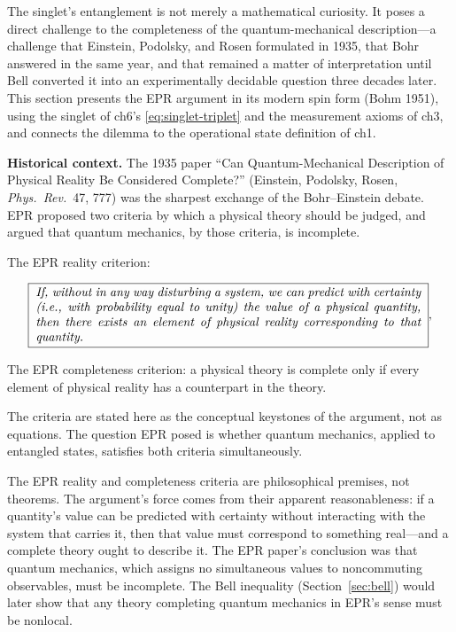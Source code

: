 The singlet's entanglement is not merely a mathematical curiosity. It poses a direct challenge to the completeness of the quantum-mechanical description---a challenge that Einstein, Podolsky, and Rosen formulated in 1935, that Bohr answered in the same year, and that remained a matter of interpretation until Bell converted it into an experimentally decidable question three decades later. This section presents the EPR argument in its modern spin form (Bohm 1951), using the singlet of ch6's \eqref{eq:singlet-triplet} and the measurement axioms of ch3, and connects the dilemma to the operational state definition of ch1.

\medskip\noindent\textbf{Historical context.}
The 1935 paper ``Can Quantum-Mechanical Description of Physical Reality Be Considered Complete?'' (Einstein, Podolsky, Rosen, \textit{Phys.\ Rev.}\ 47, 777) was the sharpest exchange of the Bohr--Einstein debate. EPR proposed two criteria by which a physical theory should be judged, and argued that quantum mechanics, by those criteria, is incomplete.

The EPR reality criterion:
\begin{linenomath}
\begin{equation}
\boxed{\;
\begin{minipage}{0.9\textwidth}
\itshape
If, without in any way disturbing a system, we can predict with certainty (i.e., with probability equal to unity) the value of a physical quantity, then there exists an element of physical reality corresponding to that quantity.
\end{minipage}
\;},
\label{eq:epr-reality}
\end{equation}
\end{linenomath}
The EPR completeness criterion: a physical theory is complete only if every element of physical reality has a counterpart in the theory.

The criteria are stated here as the conceptual keystones of the argument, not as equations. The question EPR posed is whether quantum mechanics, applied to entangled states, satisfies both criteria simultaneously.

\begin{note}
The EPR reality and completeness criteria are philosophical premises, not theorems. The argument's force comes from their apparent reasonableness: if a quantity's value can be predicted with certainty without interacting with the system that carries it, then that value must correspond to something real---and a complete theory ought to describe it. The EPR paper's conclusion was that quantum mechanics, which assigns no simultaneous values to noncommuting observables, must be incomplete. The Bell inequality (Section~\ref{sec:bell}) would later show that any theory completing quantum mechanics in EPR's sense must be nonlocal.
\end{note}

